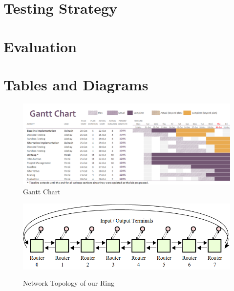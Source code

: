 \documentclass[10pt]{article}
\begin{document}
\section{Testing Strategy}


\section{Evaluation}

\newpage

\section {Tables and Diagrams}




\begin{figure}[h]
\centering
\includegraphics[scale=0.4, angle=90]{gantt}
\caption{Gantt Chart}
\label{fig:gantt}
\end{figure}

\begin{figure}
\centering
\includegraphics[scale=0.5]{topology}
\label{fig:topo}
\caption{Network Topology of our Ring}
\end{figure}
\end{document}
